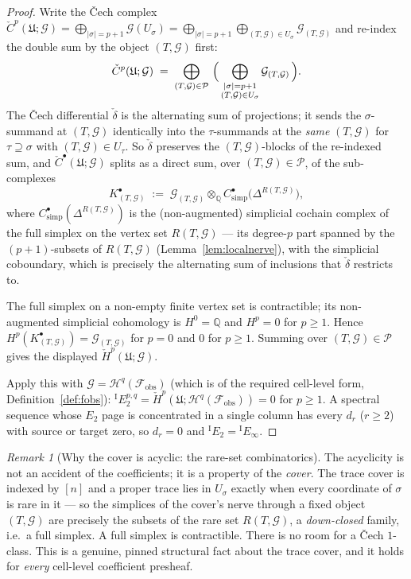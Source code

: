 \documentclass[11pt,oneside]{amsart}
\theoremstyle{plain}
\theoremstyle{definition}
\theoremstyle{remark}
\newtheorem{remark}[theorem]{Remark}
\theoremstyle{honeststyle}
\newcommand{\G}{\mathcal{G}}
\newcommand{\Q}{\mathbb{Q}}
\newcommand{\fobs}{\mathcal{F}_{\mathrm{obs}}}
\newcommand{\Pp}{\mathcal{P}}
\newcommand{\Uf}{\mathfrak{U}}
\newcommand{\rare}{R}
\begin{document}
\begin{proof}
Write the \v{C}ech complex $\check C^{p}(\Uf;\mathcal G)=
\bigoplus_{|\sigma|=p+1}\mathcal G(U_{\sigma})=\bigoplus_{|\sigma|=p+1}
\bigoplus_{(T,\G)\in U_{\sigma}}\mathcal G_{(T,\G)}$ and re-index the
double sum by the object $(T,\G)$ first:
\[
  \check C^{p}(\Uf;\mathcal G)\;=\;
  \bigoplus_{(T,\G)\in\Pp}\ \Bigl(\,
  \bigoplus_{\substack{|\sigma|=p+1\\(T,\G)\in U_{\sigma}}}
  \mathcal G_{(T,\G)}\,\Bigr).
\]
The \v{C}ech differential $\check\delta$ is the alternating sum of
projections; it sends the $\sigma$-summand at $(T,\G)$ identically
into the $\tau$-summands at the \emph{same} $(T,\G)$ for $\tau\supseteq
\sigma$ with $(T,\G)\in U_{\tau}$. So $\check\delta$ preserves the
$(T,\G)$-blocks of the re-indexed sum, and $\check C^{\bullet}(\Uf;
\mathcal G)$ splits as a direct sum, over $(T,\G)\in\Pp$, of the
sub-complexes
\[
  K^{\bullet}_{(T,\G)}\;:=\;
  \mathcal G_{(T,\G)}\otimes_{\Q}
  C^{\bullet}_{\mathrm{simp}}\bigl(\Delta^{\rare(T,\G)}\bigr),
\]
where $C^{\bullet}_{\mathrm{simp}}(\Delta^{\rare(T,\G)})$ is the
(non-augmented) simplicial cochain complex of the full simplex on the
vertex set $\rare(T,\G)$ --- its degree-$p$ part spanned by the
$(p+1)$-subsets of $\rare(T,\G)$ (Lemma~\ref{lem:localnerve}), with
the simplicial coboundary, which is precisely the alternating sum of
inclusions that $\check\delta$ restricts to.

The full simplex on a non-empty finite vertex set is contractible;
its non-augmented simplicial cohomology is $H^{0}=\Q$ and $H^{p}=0$
for $p\ge1$. Hence $H^{p}(K^{\bullet}_{(T,\G)})=\mathcal G_{(T,\G)}$
for $p=0$ and $0$ for $p\ge1$. Summing over $(T,\G)\in\Pp$ gives the
displayed $\check H^{p}(\Uf;\mathcal G)$.

Apply this with $\mathcal G=\mathcal H^{q}(\fobs)$ (which is of the
required cell-level form, Definition~\ref{def:fobs}): ${}^{\mathrm{I}}
E_{2}^{p,q}=\check H^{p}(\Uf;\mathcal H^{q}(\fobs))=0$ for $p\ge1$.
A spectral sequence whose $E_{2}$ page is concentrated in a single
column has every $d_{r}$ ($r\ge2$) with source or target zero, so
$d_{r}=0$ and ${}^{\mathrm{I}}E_{2}={}^{\mathrm{I}}E_{\infty}$.
\end{proof}

\begin{remark}[Why the cover is acyclic: the rare-set combinatorics]
\label{rem:why-acyclic}
The acyclicity is not an accident of the coefficients; it is a
property of the \emph{cover}. The trace cover is indexed by $[n]$ and a
proper trace lies in $U_{\sigma}$ exactly when every coordinate of
$\sigma$ is rare in it --- so the simplices of the cover's nerve
through a fixed object $(T,\G)$ are precisely the subsets of the rare
set $\rare(T,\G)$, a \emph{down-closed} family, i.e.\ a full simplex.
A full simplex is contractible. There is no room for a \v{C}ech
$1$-class. This is a genuine, pinned structural fact about the trace
cover, and it holds for \emph{every} cell-level coefficient presheaf.
\end{remark}
\end{document}

